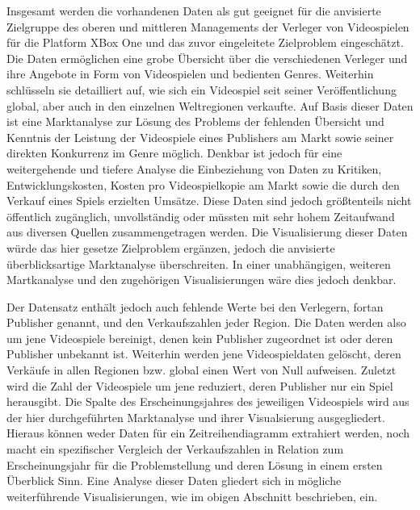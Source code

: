 \documentclass[usegeometry=true]{scrartcl}
\begin{document}
Insgesamt werden die vorhandenen Daten als gut geeignet für die anvisierte Zielgruppe des oberen und mittleren Managements der Verleger von Videospielen für die Platform XBox One und das zuvor eingeleitete Zielproblem eingeschätzt. 
Die Daten ermöglichen eine grobe Übersicht über die verschiedenen Verleger und ihre Angebote in Form von Videospielen und bedienten Genres. 
Weiterhin schlüsseln sie detailliert auf, wie sich ein Videospiel seit seiner Veröffentlichung global, aber auch in den einzelnen Weltregionen verkaufte. 
Auf Basis dieser Daten ist eine Marktanalyse zur Lösung des Problems der fehlenden Übersicht und Kenntnis der Leistung der Videospiele eines Publishers am Markt sowie seiner direkten Konkurrenz im Genre möglich. 
Denkbar ist jedoch für eine weitergehende und tiefere Analyse die Einbeziehung von Daten zu Kritiken, Entwicklungskosten, Kosten pro Videospielkopie am Markt sowie die durch den Verkauf eines Spiels erzielten Umsätze. 
Diese Daten sind jedoch größtenteils nicht öffentlich zugänglich, unvollständig oder müssten mit sehr hohem Zeitaufwand aus diversen Quellen zusammengetragen werden. 
Die Visualisierung dieser Daten würde das hier gesetze Zielproblem ergänzen, jedoch die anvisierte überblicksartige Marktanalyse überschreiten. 
In einer unabhängigen, weiteren Martkanalyse und den zugehörigen Visualisierungen wäre dies jedoch denkbar.    

Der Datensatz enthält jedoch auch fehlende Werte bei den Verlegern, fortan Publisher genannt, und den Verkaufszahlen jeder Region. 
Die Daten werden also um jene Videospiele bereinigt, denen kein Publisher zugeordnet ist oder deren Publisher unbekannt ist. 
Weiterhin werden jene Videospieldaten gelöscht, deren Verkäufe in allen Regionen bzw. global einen Wert von Null aufweisen. 
Zuletzt wird die Zahl der Videospiele um jene reduziert, deren Publisher nur ein Spiel herausgibt.  
Die Spalte des Erscheinungsjahres des jeweiligen Videospiels wird aus der hier durchgeführten Marktanalyse und ihrer Visualsierung ausgegliedert. 
Hieraus können weder Daten für ein Zeitreihendiagramm extrahiert werden, noch macht ein spezifischer Vergleich der Verkaufszahlen in Relation zum Erscheinungsjahr für die Problemstellung und deren Lösung in einem ersten Überblick Sinn. Eine Analyse dieser Daten gliedert sich in mögliche weiterführende Visualisierungen, wie im obigen Abschnitt beschrieben, ein. 
\end{document}

